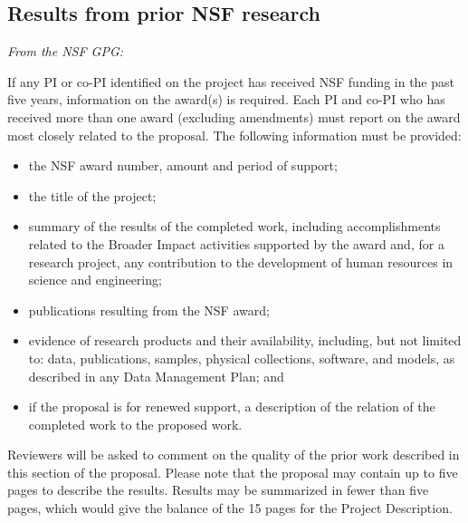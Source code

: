 
\subsection{Results from prior NSF research}

{\em From the NSF GPG:

If any PI or co-PI identified on the project has received NSF funding in the past five years, information on the award(s) is required. Each PI and co-PI who has received more than one award (excluding amendments) must report on the award most closely related to the proposal. The following information must be provided:
\begin{itemize}
\item	the NSF award number, amount and period of support;

\item	the title of the project;

\item	summary of the results of the completed work, including accomplishments related to the Broader Impact activities supported by the award and, for a research project, any contribution to the development of human resources in science and engineering;

\item	publications resulting from the NSF award;

\item	evidence of research products and their availability, including, but not limited to: data, publications, samples, physical collections, software, and models, as described in any Data Management Plan; and

\item	if the proposal is for renewed support, a description of the relation of the completed work to the proposed work.

\end{itemize}
Reviewers will be asked to comment on the quality of the prior work described in this section of the proposal. Please note that the proposal may contain up to five pages to describe the results. Results may be summarized in fewer than five pages, which would give the balance of the 15 pages for the Project Description.

}



